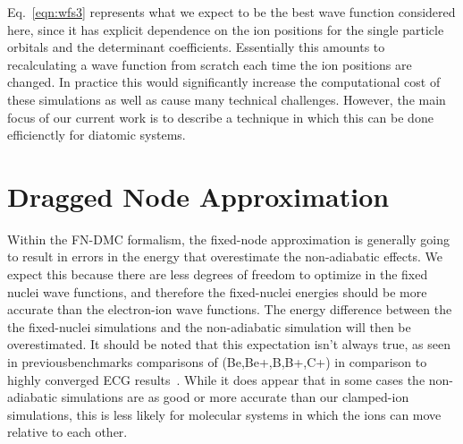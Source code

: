 \documentclass[aip,jcp,numerical,reprint]{revtex4-1}
\begin{document}
Eq.~\eqref{eqn:wfs3} represents what we expect to be the best wave function considered here, since it has explicit dependence on the ion positions for the single particle orbitals and the determinant coefficients. Essentially this amounts to recalculating a wave function from scratch each time the ion positions are changed.  In practice this would significantly increase the computational cost of these simulations as well as cause many technical challenges.  However, the main focus of our current work is to describe a technique in which this can be done efficienctly for diatomic systems. 


\section{Dragged Node Approximation}


Within the FN-DMC formalism, the fixed-node approximation is generally going to result in errors in the energy that overestimate the non-adiabatic effects.   We expect this because there are less degrees of freedom to optimize in the fixed nuclei wave functions, and therefore the fixed-nuclei energies should be more accurate than the electron-ion wave functions.   The energy difference between the the fixed-nuclei simulations and the non-adiabatic simulation will then be overestimated.  It should be noted that this expectation isn't always true, as seen in previousbenchmarks comparisons of (Be,Be+,B,B+,C+) in comparison to highly converged ECG results~\cite{Yang2015}.  While it does appear that in some cases the non-adiabatic simulations are as good or more accurate than our clamped-ion simulations, this is less likely for molecular systems in which the ions can move relative to each other.    %
\end{document}
